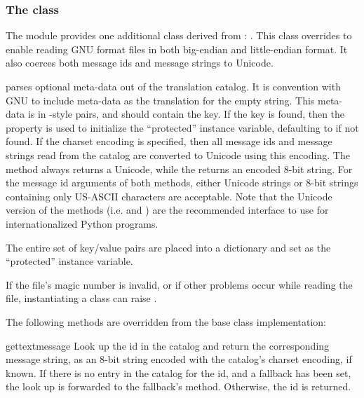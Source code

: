 \subsubsection{The  class}

The  module provides one additional class derived from
: .  This class
overrides  to enable reading GNU 
format  files in both big-endian and little-endian format.
It also coerces both message ids and message strings to Unicode.

 parses optional meta-data out of the
translation catalog.  It is convention with GNU  to
include meta-data as the translation for the empty string.  This
meta-data is in -style  pairs, and should
contain the  key.  If the key
 is found, then the  property is used
to initialize the ``protected''  instance variable,
defaulting to  if not found.  If the charset encoding is
specified, then all message ids and message strings read from the
catalog are converted to Unicode using this encoding.  The
 method always returns a Unicode, while the
 returns an encoded 8-bit string.  For the message
id arguments of both methods, either Unicode strings or 8-bit strings
containing only US-ASCII characters are acceptable.  Note that the
Unicode version of the methods (i.e.  and
) are the recommended interface to use for
internationalized Python programs.

The entire set of key/value pairs are placed into a dictionary and set
as the ``protected''  instance variable.

If the  file's magic number is invalid, or if other problems
occur while reading the file, instantiating a  class
can raise .

The following methods are overridden from the base class implementation:

\begin{methoddesc}[GNUTranslations]{gettext}{message}
Look up the  id in the catalog and return the
corresponding message string, as an 8-bit string encoded with the
catalog's charset encoding, if known.  If there is no entry in the
catalog for the  id, and a fallback has been set, the
look up is forwarded to the fallback's  method.
Otherwise, the  id is returned.
\end{methoddesc}

